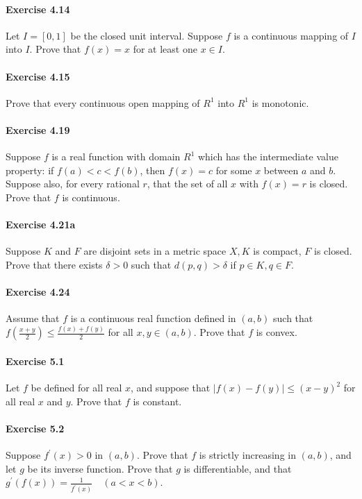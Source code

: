 \documentclass{article}
\begin{document}
\paragraph{Exercise 4.14} Let $I=[0,1]$ be the closed unit interval. Suppose $f$ is a continuous mapping of $I$ into $I$. Prove that $f(x)=x$ for at least one $x \in I$.

\paragraph{Exercise 4.15} Prove that every continuous open mapping of $R^{1}$ into $R^{1}$ is monotonic.

\paragraph{Exercise 4.19} Suppose $f$ is a real function with domain $R^{1}$ which has the intermediate value property: if $f(a)<c<f(b)$, then $f(x)=c$ for some $x$ between $a$ and $b$. Suppose also, for every rational $r$, that the set of all $x$ with $f(x)=r$ is closed. Prove that $f$ is continuous.

\paragraph{Exercise 4.21a} Suppose $K$ and $F$ are disjoint sets in a metric space $X, K$ is compact, $F$ is closed. Prove that there exists $\delta>0$ such that $d(p, q)>\delta$ if $p \in K, q \in F$.

\paragraph{Exercise 4.24} Assume that $f$ is a continuous real function defined in $(a, b)$ such that $f\left(\frac{x+y}{2}\right) \leq \frac{f(x)+f(y)}{2}$ for all $x, y \in(a, b)$. Prove that $f$ is convex.

\paragraph{Exercise 5.1} Let $f$ be defined for all real $x$, and suppose that $|f(x)-f(y)| \leq (x-y)^{2}$ for all real $x$ and $y$. Prove that $f$ is constant.

\paragraph{Exercise 5.2} Suppose $f^{\prime}(x)>0$ in $(a, b)$. Prove that $f$ is strictly increasing in $(a, b)$, and let $g$ be its inverse function. Prove that $g$ is differentiable, and that $g^{\prime}(f(x))=\frac{1}{f^{\prime}(x)} \quad(a<x<b)$.
\end{document}
